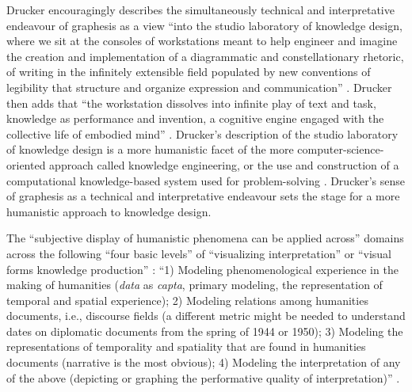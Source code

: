 Drucker encouragingly describes the simultaneously technical and interpretative endeavour of graphesis as a view ``into the studio laboratory of knowledge design, where we sit at the consoles of workstations meant to help engineer and imagine the creation and implementation of a diagrammatic and constellationary rhetoric, of writing in the infinitely extensible field populated by new conventions of legibility that structure and organize expression and communication” \citep[p. 197]{drucker_graphesis_2014}. Drucker then adds that ``the workstation dissolves into infinite play of text and task, knowledge as performance and invention, a cognitive engine engaged with the collective life of embodied mind” \citep[p. 197]{drucker_graphesis_2014}. Drucker’s description of the studio laboratory of knowledge design is a more humanistic facet of the more computer-science-oriented approach called knowledge engineering, or the use and construction of a computational knowledge-based system used for problem-solving \citep[p. 8]{wielinga_kads_1992}. Drucker’s sense of graphesis as a technical and interpretative endeavour sets the stage for a more humanistic approach to knowledge design.
 
The ``subjective display of humanistic phenomena can be applied across” domains across the following ``four basic levels” of ``visualizing interpretation” \citep[p. 135]{ drucker_graphesis_2014} or ``visual forms knowledge production” \citep{drucker_graphesis_2014}: 
“1) Modeling phenomenological experience in the making of humanities (\textit{data} as \textit{capta}, primary modeling, the representation of temporal and spatial experience); 
2) Modeling relations among humanities documents, i.e., discourse fields (a different metric might be needed to understand dates on diplomatic documents from the spring of 1944 or 1950); 
3) Modeling the representations of temporality and spatiality that are found in humanities documents (narrative is the most obvious); 
4) Modeling the interpretation of any of the above (depicting or graphing the performative quality of interpretation)” \citep[p. 135]{ drucker_graphesis_2014}. 

